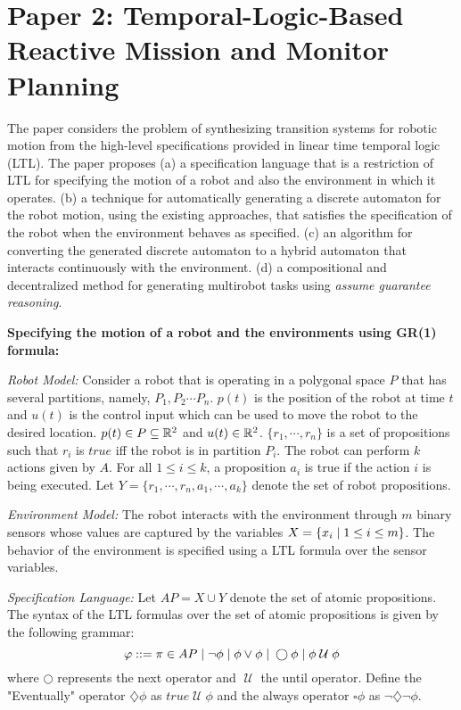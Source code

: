 \newcommand{\next}{\bigcirc}
\newcommand{\until}{\mathcal{\; U \;}}
\newcommand{\eventually}{\diamond}
\renewcommand{\eventually}{\diamondsuit}
\newcommand{\always}{\square}

\section{Paper 2: Temporal-Logic-Based Reactive Mission and Monitor Planning \cite{gazit:95}} \label{sec:paper2}

The paper considers the problem of synthesizing transition systems for robotic motion from the 
high-level specifications  provided in linear time temporal logic (LTL). The paper proposes  
(a) a specification language that is a restriction of LTL for specifying the motion of a robot
and also the environment in which it operates.  
(b) a technique for automatically generating a discrete automaton for the robot motion, using the 
existing approaches, that satisfies the specification of the robot when the environment behaves as specified. 
(c) an algorithm for converting the generated discrete automaton to a hybrid automaton that interacts 
continuously with the environment.
(d) a compositional and decentralized method for generating multirobot tasks using \emph{assume guarantee reasoning}.

\textbf{Specifying the motion of a robot and the environments using GR(1) formula:}

\textit{Robot Model:} Consider a robot that is operating in a polygonal space $P$ that 
has several partitions, namely, $P_1,P_2 \cdots P_n$. $p(t)$ is the position of the robot at time $t$
and $u(t)$ is the control input which can be used to move the robot to the desired location. 
$p(t) \in P \subseteq \mathbb{R}^2$ and $u(t) \in \mathbb{R}^2$. 
$\{ r_1,\cdots,r_n \}$ is a set of propositions such that $r_i$ is $true$ iff the robot is in  partition $P_i$.
The robot can perform $k$ actions given by $A$.  For all $1 \le i \le k$, a proposition $a_i$ is true if the
action $i$ is being executed.
Let $Y = \{ r_1,\cdots,r_n, a_1,\cdots,a_k \}$ denote the set of robot propositions.

\textit{Environment Model:}
The robot interacts with the environment through $m$ binary sensors whose values are captured by 
the variables $X = \{ x_i \; | \; 1 \le i \le m\}$. 
The behavior of the environment is specified using a LTL formula over the sensor variables.

\textit{Specification Language:} Let $AP = X \cup Y$  denote the set of atomic propositions.
The syntax of the LTL formulas over the set of atomic propositions is given by the following grammar:
\[ \varphi ::= \pi \in AP \vbar \neg \phi \vbar \phi \vee \phi \vbar  \next \phi \vbar \phi \until \phi  \]
where $\next$ represents the next operator and $\until$ the until operator.
Define  the "Eventually" operator $\eventually \phi$ as $true \until \phi$ and the 
always operator $\always \phi$ as $\neg \eventually \neg \phi$.

